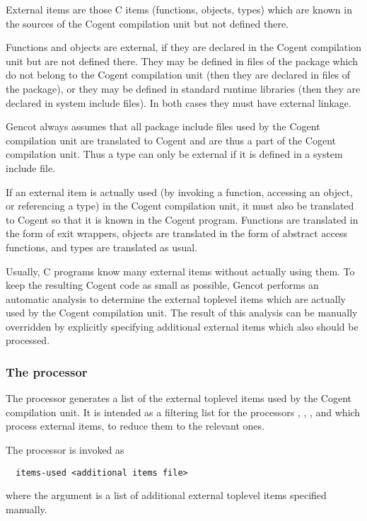 External items are those C items (functions, objects, types) which are known in the sources of the Cogent compilation
unit but not defined there. 

Functions and objects are external, if they are declared in the 
Cogent compilation unit but are not defined there. They may be defined in files of the package which do not belong to
the Cogent compilation unit (then they are declared in  files of the package), or they may be defined in 
standard runtime libraries (then they are declared in system include files). In both cases they must have external linkage.

Gencot always assumes that all package include files used by the Cogent compilation unit are translated to Cogent and
are thus a part of the Cogent compilation unit. Thus a type can only be external if it is defined in a system include
file.

If an external item is actually used (by invoking a function, accessing an object, or referencing a type) in the Cogent
compilation unit, it must also be translated to Cogent so that it is known in the Cogent program. Functions are translated
in the form of exit wrappers, objects are translated in the form of abstract access functions, and types are translated
as usual.

Usually, C programs know many external items without actually using them. To keep the resulting Cogent code as small 
as possible, Gencot performs an automatic analysis to determine the external toplevel items which are actually used
by the Cogent compilation unit. The result of this analysis can be manually overridden by explicitly specifying additional
external items which also should be processed.

\subsubsection{The processor }

The processor  generates a list of the external toplevel items used by the Cogent compilation unit.
It is intended as a filtering list for the processors , , ,
 and  which process external items, to reduce them to the relevant ones.

The processor is invoked as
\begin{verbatim}
  items-used <additional items file>
\end{verbatim}
where the argument is a list of additional external toplevel items specified manually.


